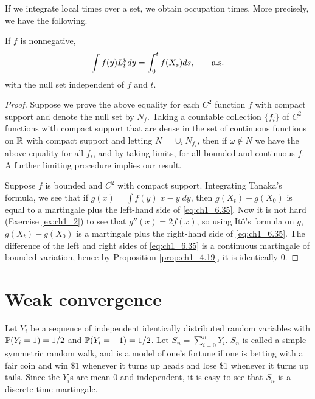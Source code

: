 If we integrate local times over a set, we obtain occupation times. More precisely, we have the following.

\begin{proposition}\label{prop:ch1_6.17}
If $f$ is nonnegative,
\begin{equation}\label{eq:ch1_6.35}
    \int f(y)L_t^y dy = \int_0^t f(X_s)ds, \qquad \textnormal{a.s.}
\end{equation}
with the null set independent of $f$ and $t$.
\end{proposition}

\begin{proof}
Suppose we prove the above equality for each $C^2$ function $f$ with compact support and denote the null set by $N_f$. Taking a countable collection $\{f_i\}$ of $C^2$ functions with compact support that are dense in the set of continuous functions on $\R$ with compact support and letting $N = \cup_i N_{f_i}$, then if $\omega \notin N$ we have the above equality for all $f_i$, and by taking limits, for all bounded and continuous $f$. A further limiting procedure implies our result.

Suppose $f$ is bounded and $C^2$ with compact support. Integrating Tanaka's formula, we see that if $g(x) = \int f(y)|x-y|dy$, then $g(X_t) - g(X_0)$ is equal to a martingale plus the left-hand side of \eqref{eq:ch1_6.35}. Now it is not hard (Exercise \ref{ex:ch1_2}) to see that $g''(x) = 2f(x)$, so using It\^o's formula on $g$, $g(X_t)-g(X_0)$ is a martingale plus the right-hand side of \eqref{eq:ch1_6.35}. The difference of the left and right sides of \eqref{eq:ch1_6.35} is a continuous martingale of bounded variation, hence by Proposition \ref{prop:ch1_4.19}, it is identically $0$.
\end{proof}


\section{Weak convergence}\label{ch1_sec7}


Let $Y_i$ be a sequence of independent identically distributed random variables with $\P(Y_i = 1) = 1/2$ and $\P(Y_i = -1) = 1/2$. Let $S_n = \sum_{i=0}^n Y_i$. $S_n$ is called a simple symmetric random walk, and is a model of one's fortune if one is betting with a fair coin and win \$1 whenever it turns up heads and lose \$1 whenever it turns up tails. Since the $Y_i$s are mean $0$ and independent, it is easy to see that $S_n$ is a discrete-time martingale.

